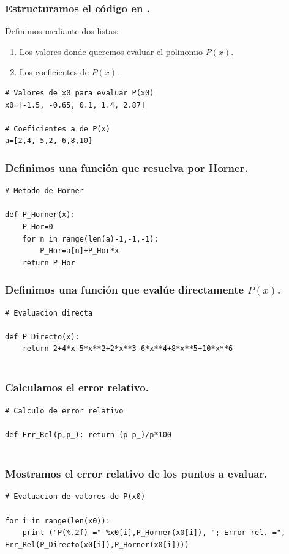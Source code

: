 \begin{frame}[fragile]
\frametitle{Estructuramos el código en \python.}
Definimos mediante dos listas: 
\begin{enumerate}
\item Los valores donde queremos evaluar el polinomio $P(x)$.
\item Los coeficientes de $P(x)$.
\end{enumerate}
\begin{lstlisting}[basicstyle=\ttfamily\large, columns=fullflexible]
# Valores de x0 para evaluar P(x0)
x0=[-1.5, -0.65, 0.1, 1.4, 2.87]

# Coeficientes a de P(x)
a=[2,4,-5,2,-6,8,10]
\end{lstlisting}
\end{frame}
\begin{frame}[fragile]
\frametitle{Definimos una función que resuelva por Horner.}
\fontsize{14}{14}\selectfont
\begin{lstlisting}[basicstyle=\ttfamily\large, columns=fullflexible]
# Metodo de Horner

def P_Horner(x):
    P_Hor=0
    for n in range(len(a)-1,-1,-1):     
        P_Hor=a[n]+P_Hor*x
    return P_Hor
\end{lstlisting}
\end{frame}
\begin{frame}[fragile]
\frametitle{Definimos una función que evalúe directamente $P(x)$.}
\fontsize{14}{14}\selectfont
\begin{lstlisting}[basicstyle=\ttfamily\large, columns=fullflexible]
# Evaluacion directa

def P_Directo(x):
    return 2+4*x-5*x**2+2*x**3-6*x**4+8*x**5+10*x**6
    
\end{lstlisting}
\end{frame}
\begin{frame}[fragile]
\frametitle{Calculamos el error relativo.}
\fontsize{14}{14}\selectfont
\begin{lstlisting}[basicstyle=\ttfamily\large, columns=fullflexible]
# Calculo de error relativo

def Err_Rel(p,p_): return (p-p_)/p*100
    
\end{lstlisting}
\end{frame}
\begin{frame}[fragile]
\frametitle{Mostramos el error relativo de los puntos a evaluar.}
\fontsize{14}{14}\selectfont
\begin{lstlisting}[basicstyle=\ttfamily\large, columns=fullflexible]
# Evaluacion de valores de P(x0)

for i in range(len(x0)):                 
    print ("P(%.2f) =" %x0[i],P_Horner(x0[i]), "; Error rel. =", Err_Rel(P_Directo(x0[i]),P_Horner(x0[i])))
\end{lstlisting}
\end{frame}
